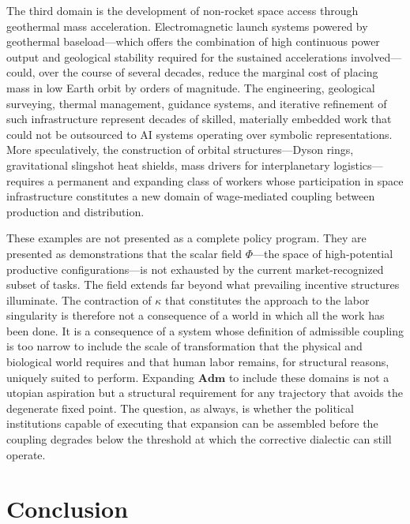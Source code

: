 \documentclass[11pt, a4paper]{article}
\theoremstyle{plain}
\theoremstyle{definition}
\newcommand{\Phifield}{\Phi}
\newcommand{\Adm}{\mathbf{Adm}}
\newcommand{\coupling}{\kappa}
\begin{document}
The third domain is the development of non-rocket space access through
geothermal mass acceleration. Electromagnetic launch systems powered by
geothermal baseload---which offers the combination of high continuous power
output and geological stability required for the sustained accelerations
involved---could, over the course of several decades, reduce the marginal cost
of placing mass in low Earth orbit by orders of magnitude. The engineering,
geological surveying, thermal management, guidance systems, and iterative
refinement of such infrastructure represent decades of skilled, materially
embedded work that could not be outsourced to AI systems operating over
symbolic representations. More speculatively, the construction of orbital
structures---Dyson rings, gravitational slingshot heat shields, mass drivers
for interplanetary logistics---requires a permanent and expanding class of
workers whose participation in space infrastructure constitutes a new domain
of wage-mediated coupling between production and distribution.

These examples are not presented as a complete policy program. They are
presented as demonstrations that the scalar field $\Phifield$---the space of
high-potential productive configurations---is not exhausted by the current
market-recognized subset of tasks. The field extends far beyond what prevailing
incentive structures illuminate. The contraction of $\coupling$ that constitutes
the approach to the labor singularity is therefore not a consequence of a world
in which all the work has been done. It is a consequence of a system whose
definition of admissible coupling is too narrow to include the scale of
transformation that the physical and biological world requires and that human
labor remains, for structural reasons, uniquely suited to perform. Expanding
$\Adm$ to include these domains is not a utopian aspiration but a structural
requirement for any trajectory that avoids the degenerate fixed point. The
question, as always, is whether the political institutions capable of executing
that expansion can be assembled before the coupling degrades below the threshold
at which the corrective dialectic can still operate.

\section*{Conclusion}
\end{document}
